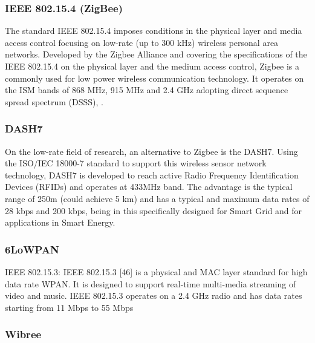 \subsubsection{IEEE 802.15.4 (ZigBee)}

The standard IEEE 802.15.4 imposes conditions in the physical layer and media access control focusing on low-rate (up to 300 kHz) wireless personal area networks. Developed by the Zigbee Alliance and covering the specifications of the IEEE 802.15.4 on the physical layer and the medium access control, Zigbee is a commonly used for low power wireless communication technology. It operates on the ISM bands of 868 MHz, 915 MHz and 2.4 GHz adopting direct sequence spread spectrum (DSSS), \cite{Usman2013}.



\subsubsection{DASH7}

On the low-rate field of research, an alternative to Zigbee is the DASH7. Using the ISO/IEC 18000-7 standard to support this wireless sensor network technology, DASH7 is developed to reach active Radio Frequency Identification Devices (RFIDs) and operates at 433MHz band. The advantage is the typical range of 250m (could achieve 5 km) and has a typical and maximum data rates of 28 kbps and 200 kbps, being in this specifically designed for Smart Grid and for applications in Smart Energy.


\subsubsection{6LoWPAN}

IEEE 802.15.3: IEEE 802.15.3 [46] is a physical and MAC
layer standard for high data rate WPAN. It is designed to
support real-time multi-media streaming of video and music.
IEEE 802.15.3 operates on a 2.4 GHz radio and has data
rates starting from 11 Mbps to 55 Mbps

\subsubsection{Wibree}

